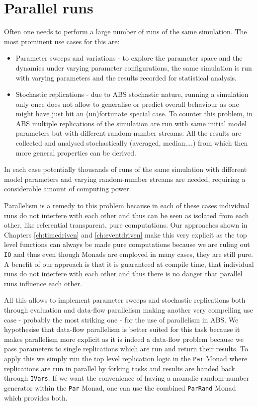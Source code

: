 \section{Parallel runs}
Often one needs to perform a large number of runs of the same simulation. The most prominent use cases for this are:

\begin{itemize}
	\item Parameter sweeps and variations - to explore the parameter space and the dynamics under varying parameter configurations, the same simulation is run with varying parameters and the results recorded for statistical analysis.
	
	\item Stochastic replications - due to ABS stochastic nature, running a simulation only once does not allow to generalise or predict overall behaviour as one might have just hit an (un)fortunate special case. To counter this problem, in ABS multiple replications of the  simulation are run with same initial model parameters but with different random-number streams. All the results are collected and analysed stochastically (averaged, median,...) from which then more general properties can be derived.
\end{itemize}

In each case potentially thousands of runs of the same simulation with different model parameters and varying random-number streams are needed, requiring a considerable amount of computing power.

Parallelism is a remedy to this problem because in each of these cases individual runs do not interfere with each other and thus can be seen as isolated from each other, like referential transparent, pure computations. Our approaches shown in Chapters  \ref{ch:timedriven} and \ref{ch:eventdriven} make this very explicit as the top level functions can always be made pure computations because we are ruling out \texttt{IO} and thus even though Monads are employed in many cases, they are still pure. A benefit of our approach is that it is guaranteed at compile time, that individual runs do not interfere with each other and thus there is no danger that parallel runs influence each other. 

All this allows to implement parameter sweeps and stochastic replications both through evaluation and data-flow parallelism making another very compelling use case - probably the most striking one - for the use of parallelism in ABS. We hypothesise that data-flow parallelism is better suited for this task because it makes parallelism more explicit as it is indeed a data-flow problem because we pass parameters to single replications which are run and return their results. To apply this we simply run the top level replication logic in the \texttt{Par} Monad where replications are run in parallel by forking tasks and results are handed back through \texttt{IVars}. If we want the convenience of having a monadic random-number generator within the \texttt{Par} Monad, one can use the combined \texttt{ParRand} Monad which provides both.